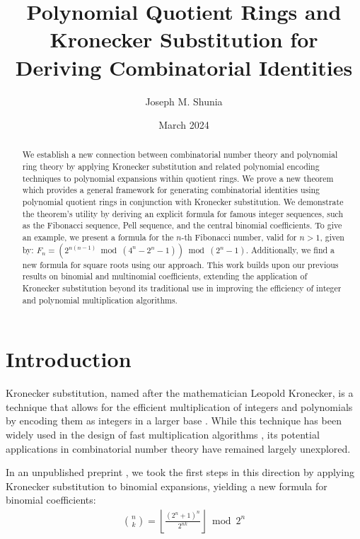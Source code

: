 \documentclass[11pt,reqno]{article}
\theoremstyle{plain}
\theoremstyle{definition}
\newcommand{\floor}[1]{\left\lfloor #1 \right\rfloor}
\begin{document}
\title{Polynomial Quotient Rings and Kronecker Substitution for Deriving Combinatorial Identities}
\author{Joseph M. Shunia}
\date{March 2024}

\maketitle

\begin{abstract}
We establish a new connection between combinatorial number theory and polynomial ring theory by applying Kronecker substitution and related polynomial encoding techniques to polynomial expansions within quotient rings. We prove a new theorem which provides a general framework for generating combinatorial identities using polynomial quotient rings in conjunction with Kronecker substitution. We demonstrate the theorem's utility by deriving an explicit formula for famous integer sequences, such as the Fibonacci sequence, Pell sequence, and the central binomial coefficients. To give an example, we present a formula for the $n$-th Fibonacci number, valid for $n > 1$, given by: $F_n = (2^{n (n - 1)} \bmod{(4^n-2^n-1)}) \bmod{(2^n-1)}$. Additionally, we find a new formula for square roots using our approach. This work builds upon our previous results on binomial and multinomial coefficients, extending the application of Kronecker substitution beyond its traditional use in improving the efficiency of integer and polynomial multiplication algorithms.
\end{abstract}

\section{Introduction}
Kronecker substitution, named after the mathematician Leopold Kronecker, is a technique that allows for the efficient multiplication of integers and polynomials by encoding them as integers in a larger base \cite{kronecker1882}. While this technique has been widely used in the design of fast multiplication algorithms \cite{harvey2009kronecker, harvey2014faster, albrecht2018implementing, bos2020postquantum, greuet2022modular}, its potential applications in combinatorial number theory have remained largely unexplored.

In an unpublished preprint \cite{shunia2023simple}, we took the first steps in this direction by applying Kronecker substitution to binomial expansions, yielding a new formula for binomial coefficients:
\begin{align*}
    \binom{n}{k} = \floor{\frac{(2^n+1)^n}{2^{n k}}} \bmod{2^n}
\end{align*}
\end{document}
